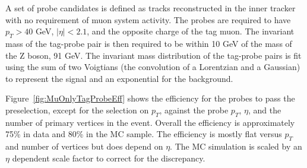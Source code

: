 A set of probe candidates is defined as tracks reconstructed in the inner tracker with no requirement
of muon system activity. The probes are required to have $p_T > 40$ GeV, $|\eta| < 2.1$, and the opposite charge of the tag muon.
The invariant mass of the tag-probe pair is then required to be within 10 GeV of the mass of the Z boson, 91 GeV.
The invariant mass distribution of the tag-probe pairs is fit using the
sum of two Voigtians (the convolution of a Lorentzian and a Gaussian) to represent the signal and an exponential for the background.




Figure~\ref{fig:MuOnlyTagProbeEff} shows the efficiency for the probes
to pass the preselection, except for the selection on $p_T$, against the probe
$p_T$, $\eta$, and the number of primary vertices in the event.
Overall the efficiency is approximately 75\% in data and 80\% in the MC sample.
The efficiency is mostly flat versus $p_T$ and number of vertices but does depend
on $\eta$.  The MC simulation is scaled by an $\eta$ dependent scale factor to correct for the discrepancy.


